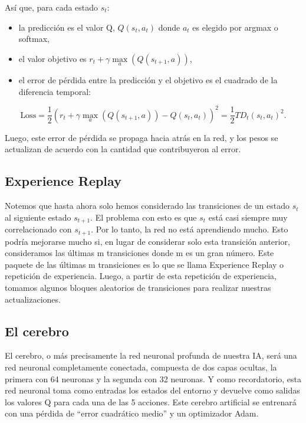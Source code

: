 \documentclass[
]{book}
\providecommand{\tightlist}{%
  \setlength{\itemsep}{0pt}\setlength{\parskip}{0pt}}
\begin{document}
Así que, para cada estado \(s_t\):

\begin{itemize}
\tightlist
\item
  la predicción es el valor Q, \(Q (s_t, a_t)\) donde \(a_t\) es elegido por argmax o softmax,
\item
  el valor objetivo es \(r_t + \gamma \underset{a}{\max}(Q(s_{t+1}, a))\),
\item
  el error de pérdida entre la predicción y el objetivo es el cuadrado de la diferencia temporal:
\end{itemize}

\[\textrm{Loss} = \frac{1}{2} \left( r_t + \gamma \underset{a}{\max}(Q(s_{t+1}, a)) - Q(s_t, a_t) \right)^2 = \frac{1}{2} TD_t(s_t, a_t)^2.\]

Luego, este error de pérdida se propaga hacia atrás en la red, y los pesos se actualizan de acuerdo con la cantidad que contribuyeron al error.

\hypertarget{experience-replay}{%
\subsection{Experience Replay}\label{experience-replay}}

Notemos que hasta ahora solo hemos considerado las transiciones de un estado \(s_t\) al siguiente estado \(s_{t + 1}\). El problema con esto es que \(s_t\) está casi siempre muy correlacionado con \(s_{t + 1}\). Por lo tanto, la red no está aprendiendo mucho. Esto podría mejorarse mucho si, en lugar de considerar solo esta transición anterior, consideramos las últimas m transiciones donde m es un gran número. Este paquete de las últimas m transiciones es lo que se llama Experience Replay o repetición de experiencia. Luego, a partir de esta repetición de experiencia, tomamos algunos bloques aleatorios de transiciones para realizar nuestras actualizaciones.

\hypertarget{el-cerebro}{%
\subsection{El cerebro}\label{el-cerebro}}

El cerebro, o más precisamente la red neuronal profunda de nuestra IA, será una red neuronal completamente conectada, compuesta de dos capas ocultas, la primera con 64 neuronas y la segunda con 32 neuronas. Y como recordatorio, esta red neuronal toma como entradas los estados del entorno y devuelve como salidas los valores Q para cada una de las 5 acciones. Este cerebro artificial se entrenará con una pérdida de ``error cuadrático medio'' y un optimizador Adam.
\end{document}
